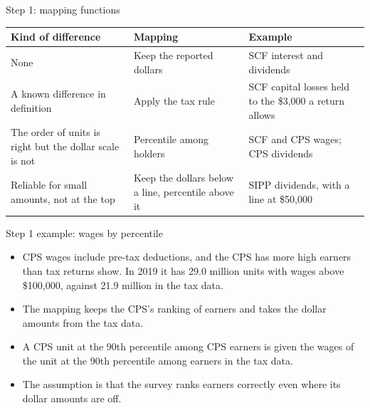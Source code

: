 \begin{frame}{Step 1: mapping functions}
  \small
  \renewcommand{\arraystretch}{1.3}
  \begin{tabular}{>{\raggedright}p{3.6cm} >{\raggedright}p{3.9cm} >{\raggedright\arraybackslash}p{5.2cm}}
    \toprule
    Kind of difference & Mapping & Example \\
    \midrule
    None & Keep the reported dollars & SCF interest and dividends \\
    A known difference in definition & Apply the tax rule & SCF capital losses held to the \$3,000 a return allows \\
    The order of units is right but the dollar scale is not & Percentile among holders & SCF and CPS wages; CPS dividends \\
    Reliable for small amounts, not at the top & Keep the dollars below a line, percentile above it & SIPP dividends, with a line at \$50,000 \\
    \bottomrule
  \end{tabular}
\end{frame}

\begin{frame}{Step 1 example: wages by percentile}
  \begin{itemize}
    \item CPS wages include pre-tax deductions, and the CPS has more high earners than tax returns
          show. In 2019 it has 29.0 million units with wages above \$100,000, against 21.9 million
          in the tax data.
    \vspace{0.5em}
    \item The mapping keeps the CPS's ranking of earners and takes the dollar amounts from the
          tax data.
    \vspace{0.5em}
    \item A CPS unit at the 90th percentile among CPS earners is given the wages of the unit at the
          90th percentile among earners in the tax data.
    \vspace{0.5em}
    \item The assumption is that the survey ranks earners correctly even where its dollar amounts
          are off.
  \end{itemize}
\end{frame}

